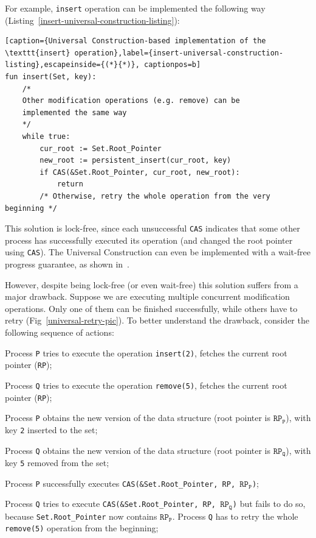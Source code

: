 \documentclass[times, dvipsnames,%
               languages={russian,english} %
              ]{itmo-student-thesis}
\begin{document}
\bigbreak

For example, \texttt{insert} operation can be implemented the following way (Listing~\ref{insert-universal-construction-listing}):

\renewcommand{\lstlistingname}{Listing}
\begin{lstlisting}[caption={Universal Construction-based implementation of the \texttt{insert} operation},label={insert-universal-construction-listing},escapeinside={(*}{*)}, captionpos=b]
fun insert(Set, key):
    /* 
    Other modification operations (e.g. remove) can be 
    implemented the same way 
    */
    while true:
        cur_root := Set.Root_Pointer
        new_root := persistent_insert(cur_root, key)
        if CAS(&Set.Root_Pointer, cur_root, new_root):
            return
        /* Otherwise, retry the whole operation from the very beginning */
\end{lstlisting}

This solution is lock-free, since each unsuccessful \texttt{CAS} indicates that some other process has successfully executed its operation (and changed the root pointer using \texttt{CAS}). The Universal Construction can even be implemented with a wait-free progress guarantee, as shown in~\cite{herlihy1991wait}.

However, despite being lock-free (or even wait-free) this solution suffers from a major drawback. Suppose we are executing multiple concurrent modification operations. Only one of them can be finished successfully, while others have to retry (Fig~\ref{universal-retry-pic}). To better understand the drawback, consider the following sequence of actions:

\begin{nenum}
    \item Process \texttt{P} tries to execute the operation \texttt{insert(2)}, fetches the current root pointer (\texttt{RP});
    
    \item Process \texttt{Q} tries to execute the operation \texttt{remove(5)}, fetches the current root pointer (\texttt{RP});
    
    \item Process \texttt{P} obtains the new version of the data structure (root pointer is $\texttt{RP}_{\texttt{P}}$), with key \texttt{2} inserted to the set;
    
    \item Process \texttt{Q} obtains the new version of the data structure (root pointer is $\texttt{RP}_{\texttt{Q}}$), with key \texttt{5} removed from the set;
    
    \item Process \texttt{P} successfully executes \texttt{CAS(\&Set.Root\_Pointer, RP, $\texttt{RP}_{\texttt{P}}$)};
    
    \item Process \texttt{Q} tries to execute \texttt{CAS(\&Set.Root\_Pointer, RP, $\texttt{RP}_{\texttt{Q}}$)} but fails to do so, because \texttt{Set.Root\_Pointer} now contains $\texttt{RP}_{\texttt{P}}$. Process \texttt{Q} has to retry the whole \texttt{remove(5)} operation from the beginning;
\end{nenum}
\end{document}
